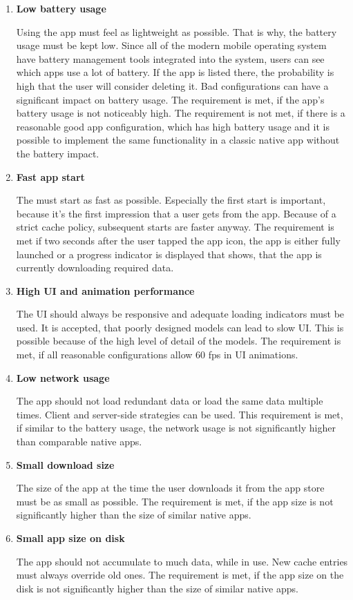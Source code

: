 \begin{enumerate}
	\item \textbf{Low battery usage}
	
	Using the app must feel as lightweight as possible.
	That is why, the battery usage must be kept low.
	Since all of the modern mobile operating system have battery management tools integrated into the system, users can see which apps use a lot of battery.
	If the app is listed there, the probability is high that the user will consider deleting it.
	Bad configurations can have a significant impact on battery usage.
	The requirement is met, if the app's battery usage is not noticeably high.
	The requirement is not met, if there is a reasonable good app configuration, which has high battery usage and it is possible to implement the same functionality in a classic native app without the battery impact.
	
	\item \textbf{Fast app start}
	
	The must start as fast as possible.
	Especially the first start is important, because it's the first impression that a user gets from the app.
	Because of a strict cache policy, subsequent starts are faster anyway.
	The requirement is met if two seconds after the user tapped the app icon, the app is either fully launched or a progress indicator is displayed that shows, that the app is currently downloading required data.
	
	\item \textbf{High \ac{UI} and animation performance}
	
	The \ac{UI} should always be responsive and adequate loading indicators must be used.
	It is accepted, that poorly designed models can lead to slow UI.
	This is possible because of the high level of detail of the models.
	The requirement is met, if all reasonable configurations allow 60 \ac{fps} in \ac{UI} animations.
	
	\item \textbf{Low network usage}
	
	The app should not load redundant data or load the same data multiple times.
	Client and server-side strategies can be used.
	This requirement is met, if similar to the battery usage, the network usage is not significantly higher than comparable native apps.
	
	\item \textbf{Small download size}
	
	The size of the app at the time the user downloads it from the app store must be as small as possible.
	The requirement is met, if the app size is not significantly higher than the size of similar native apps.
	
	\item \textbf{Small app size on disk}
	
	The app should not accumulate to much data, while in use.
	New cache entries must always override old ones.
	The requirement is met, if the app size on the disk is not significantly higher than the size of similar native apps.
	
	
\end{enumerate}


